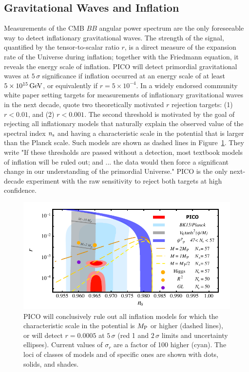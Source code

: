 \documentclass[PICOAPC.tex]{subfiles}
\begin{document}
\subsection{Gravitational Waves and Inflation}
\label{sec:inflation}

Measurements of the \ac{CMB} $BB$ angular power spectrum are the only foreseeable way to detect  inflationary gravitational waves. The strength of the signal, quantified by the tensor-to-scalar ratio $r$, is a direct measure of the expansion rate of the Universe during inflation; together with the Friedmann equation, it reveals the energy scale of inflation. PICO will detect primordial gravitational waves at $5\,\sigma$ significance if inflation occurred at an energy scale of at least $5\times 10^{15}\,\rm{GeV}$, or equivalently if $r= 5\times 10^{-4}$.  In a widely endorsed community white paper setting targets for measurements of inflationary gravitational waves in the next decade, \citet{Shandera_etal} quote two theoretically motivated $r$ rejection targets: (1) $r < 0.01$, and (2) $r < 0.001$. The second threshold is motivated by the goal of rejecting all inflationary models that naturally explain the observed value of the spectral index $n_{\rm s}$ and having a characteristic scale in the potential that is larger than the Planck scale. Such models are shown as dashed lines in Figure~\ref{fig:nsr}.  They write "If these thresholds are passed without a detection, most textbook models of inflation will be ruled out; and ... the data would then force a significant change in our understanding of the primordial Universe." PICO is the only next-decade experiment with the raw sensitivity to reject both targets at high confidence. 

\begin{figure}[!thb]
\vspace{-.1in}
\hspace{-0.13in}
\parbox{4.4in}{\centerline{
\includegraphics[width=4.5in]{figures/nsrlabeledrp0005_PICOv6.pdf} } }
\parbox{2.1in}{
\caption{\captiontext  PICO will conclusively rule out all inflation models for which the characteristic scale in the potential is $M_{\rm P}$ or higher (dashed lines), or will detect $r=0.0005$ at $5\, \sigma$ (red 1 and $2\,\sigma$ limits and uncertainty ellipses). Current values of $\sigma_{r}$ are a factor of 100 higher (cyan). 
The loci of classes of models and of specific ones are shown with dots, solids, and shades. }
\label{fig:nsr}}
\vspace{-0.16in}
\end{figure}
\end{document}
